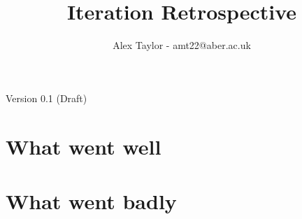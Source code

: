 \documentclass{article}
\title{Iteration Retrospective}
\author{Alex Taylor - amt22@aber.ac.uk}
\begin{document}
\maketitle
\begin{center}
	Version 0.1 (Draft)
\end{center}
\thispagestyle{empty}

\section{What went well}

\section{What went badly}
\end{document}
